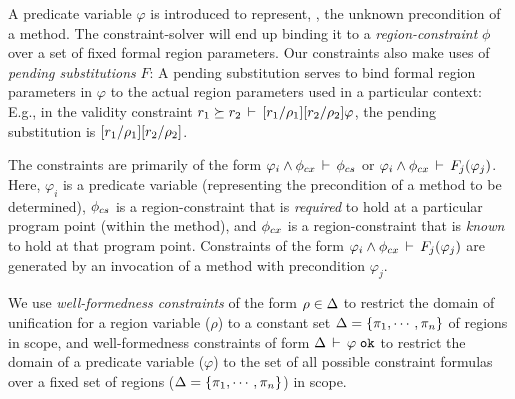 A predicate variable $\varphi$ is introduced to represent, \eg, the unknown precondition of a method.
The constraint-solver will end up binding it to a \emph{region-constraint} $\phi$
over a set of fixed formal region parameters.
%
%
Our constraints also make uses of \emph{pending substitutions} $F$:
A pending substitution serves to bind formal region parameters in $\varphi$ to the actual region parameters
used in a particular context:
E.g., in the validity constraint $r_1 \succeq
r_2\,\vdash\,[r_1/\rho_1][r_2/\rho_2]\varphi$, the pending substitution
is $[r_1/\rho_1][r_2/\rho_2]$.

The constraints are primarily of the form $\varphi_i \wedge \phi_{cx}\,\vdash\,\phi_{cs}$
or $\varphi_i \wedge \phi_{cx}\,\vdash\,F_j(\varphi_j)$.  Here, $\varphi_i$ is a predicate variable
(representing the precondition of a method to be determined), $\phi_{cs}$ is a region-constraint
that is \emph{required} to hold at a particular program point (within the method), and $\phi_{cx}$ is
a region-constraint that is \emph{known} to hold at that program point.
Constraints of the form $\varphi_i \wedge \phi_{cx}\,\vdash\,F_j(\varphi_j)$
are generated by an invocation of a method with precondition $\varphi_j$.

We use \emph{well-formedness constraints} of the form $\rho \in \Delta$
to restrict the domain of unification for a region variable ($\rho$)
to a constant set $\Delta = \{ \pi_1, \cdots, \pi_n \}$ of regions in scope,
and  well-formedness constraints of form $\Delta\,\vdash\,\varphi \; \texttt{ok}$ to
restrict the domain of a predicate variable ($\varphi$) to the set of all possible
constraint formulas over a fixed set of  regions ($\Delta = \{ \pi_1, \cdots, \pi_n \}$) in scope.

